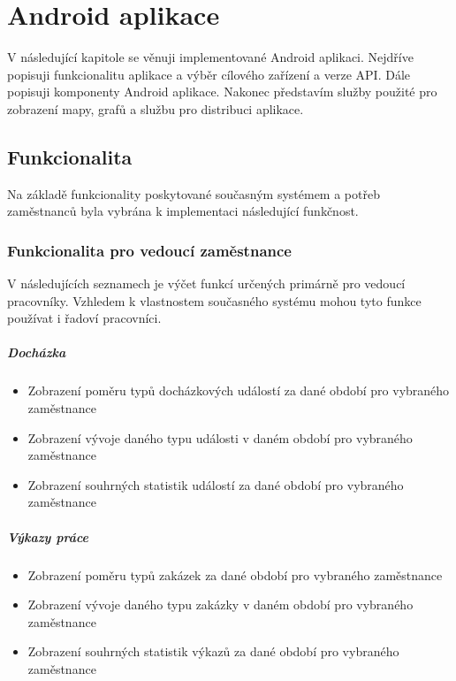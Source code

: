 \documentclass{diplomka}
\begin{document}
\chapter{Android aplikace}
V následující kapitole se věnuji implementované Android aplikaci. Nejdříve popisuji funkcionalitu aplikace a výběr cílového zařízení a verze API. Dále popisuji komponenty Android aplikace. Nakonec představím služby použité pro zobrazení mapy, grafů a službu pro distribuci aplikace.
\section{Funkcionalita}
Na základě funkcionality poskytované současným systémem a potřeb zaměstnanců byla vybrána k implementaci následující funkčnost.

\subsection{Funkcionalita pro vedoucí zaměstnance}
V následujících seznamech je výčet funkcí určených primárně pro vedoucí pracovníky. Vzhledem k vlastnostem současného systému mohou tyto funkce používat i řadoví pracovníci.

\paragraph{Docházka}
\begin{itemize}[noitemsep,nolistsep]
\item Zobrazení poměru typů docházkových událostí za dané období pro vybraného zaměstnance
\item Zobrazení vývoje daného typu události v daném období pro vybraného zaměstnance
\item Zobrazení souhrných statistik událostí za dané období pro vybraného zaměstnance
\end{itemize}

\paragraph{Výkazy práce}
\begin{itemize}[noitemsep,nolistsep]
\item Zobrazení poměru typů zakázek za dané období pro vybraného zaměstnance
\item Zobrazení vývoje daného typu zakázky v daném období pro vybraného zaměstnance
\item Zobrazení souhrných statistik výkazů za dané období pro vybraného zaměstnance
\end{itemize}
\end{document}
